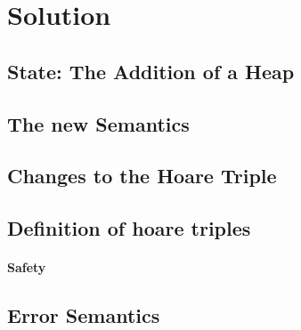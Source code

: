 \section{Solution}
\subsection{State: The Addition of a Heap}
\subsection{The new Semantics}
\subsection{Changes to the Hoare Triple}
\subsection{Definition of hoare triples}
\paragraph{Safety}
\subsection{Error Semantics}